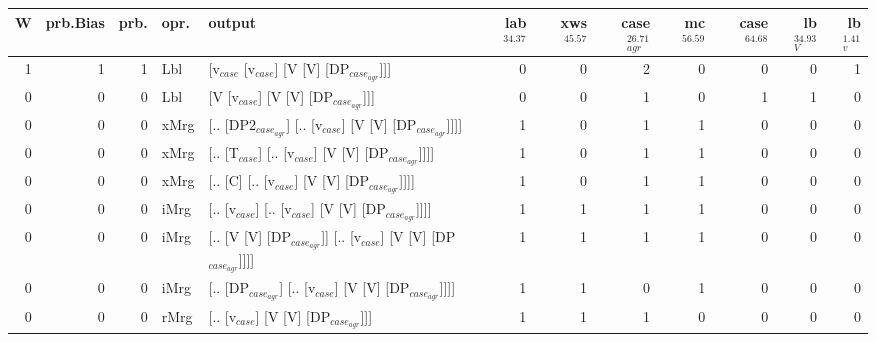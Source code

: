 \begin{tabularx}{\linewidth}{rrrlXrrrrrrr}
\hline
   W &   prb.Bias &   prb. & opr.   & output                                                         &   lab$^{34.37}$ &   xws$^{45.57}$ &   case$_{agr}^{26.71}$ &   mc$^{56.59}$ &   case$^{64.68}$ &   lb$_{V}^{34.93}$ &   lb$_{v}^{1.41}$ \\
\hline
   1 &       1 &   1 & Lbl  & [v$_{case}$ [v$_{case}$] [V [V] [DP$_{case_{agr}}$]]]                        &             0 &             0 &                  2 &            0 &              0 &              0 &             1 \\
   0 &       0 &   0 & Lbl  & [V [v$_{case}$] [V [V] [DP$_{case_{agr}}$]]]                             &             0 &             0 &                  1 &            0 &              1 &              1 &             0 \\
   0 &       0 &   0 & xMrg & [.. [DP2$_{case_{agr}}$] [.. [v$_{case}$] [V [V] [DP$_{case_{agr}}$]]]]        &             1 &             0 &                  1 &            1 &              0 &              0 &             0 \\
   0 &       0 &   0 & xMrg & [.. [T$_{case}$] [.. [v$_{case}$] [V [V] [DP$_{case_{agr}}$]]]]              &             1 &             0 &                  1 &            1 &              0 &              0 &             0 \\
   0 &       0 &   0 & xMrg & [.. [C] [.. [v$_{case}$] [V [V] [DP$_{case_{agr}}$]]]]                   &             1 &             0 &                  1 &            1 &              0 &              0 &             0 \\
   0 &       0 &   0 & iMrg & [.. [v$_{case}$] [.. [v$_{case}$] [V [V] [DP$_{case_{agr}}$]]]]              &             1 &             1 &                  1 &            1 &              0 &              0 &             0 \\
   0 &       0 &   0 & iMrg & [.. [V [V] [DP$_{case_{agr}}$]] [.. [v$_{case}$] [V [V] [DP$_{case_{agr}}$]]]] &             1 &             1 &                  1 &            1 &              0 &              0 &             0 \\
   0 &       0 &   0 & iMrg & [.. [DP$_{case_{agr}}$] [.. [v$_{case}$] [V [V] [DP$_{case_{agr}}$]]]]         &             1 &             1 &                  0 &            1 &              0 &              0 &             0 \\
   0 &       0 &   0 & rMrg & [.. [v$_{case}$] [V [V] [DP$_{case_{agr}}$]]]                            &             1 &             1 &                  1 &            0 &              0 &              0 &             0 \\
\hline
\end{tabularx}\endgroup\\
